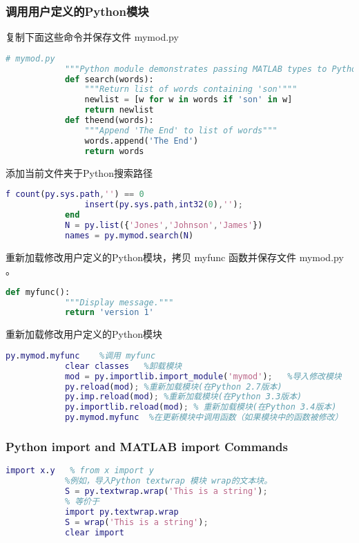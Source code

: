         \subsubsection{调用用户定义的Python模块}
            \par
            复制下面这些命令并保存文件 mymod.py
            \begin{lstlisting}[language= Python]
            # mymod.py
            """Python module demonstrates passing MATLAB types to Python functions"""
            def search(words):
                """Return list of words containing 'son'"""
                newlist = [w for w in words if 'son' in w]
                return newlist
            def theend(words):
                """Append 'The End' to list of words"""
                words.append('The End')
                return words
            \end{lstlisting}
            \par
            添加当前文件夹于Python搜索路径
            \begin{lstlisting}[language = Matlab]
            f count(py.sys.path,'') == 0
                insert(py.sys.path,int32(0),'');
            end
            N = py.list({'Jones','Johnson','James'})
            names = py.mymod.search(N)
            \end{lstlisting}
            \par
            重新加载修改用户定义的Python模块，拷贝 myfunc 函数并保存文件 mymod.py 。
            \begin{lstlisting}[language = Python]
            def myfunc():
            """Display message."""
            return 'version 1'
            \end{lstlisting}
            \par
            重新加载修改用户定义的Python模块
            \begin{lstlisting}[language = Matlab]
            py.mymod.myfunc    %调用 myfunc
            clear classes   %卸载模块
            mod = py.importlib.import_module('mymod');   %导入修改模块
            py.reload(mod); %重新加载模块(在Python 2.7版本)
            py.imp.reload(mod); %重新加载模块(在Python 3.3版本)
            py.importlib.reload(mod); % 重新加载模块(在Python 3.4版本)
            py.mymod.myfunc  %在更新模块中调用函数（如果模块中的函数被修改）
            \end{lstlisting}
        \subsubsection{Python import and MATLAB import Commands}
            \par
            \begin{lstlisting}[language = Matlab]
            import x.y   % from x import y
            %例如，导入Python textwrap 模块 wrap的文本块。
            S = py.textwrap.wrap('This is a string');
            % 等价于
            import py.textwrap.wrap
            S = wrap('This is a string');
            clear import
            \end{lstlisting}
